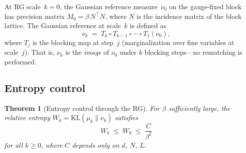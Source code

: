 \documentclass[11pt]{article}
\newtheorem{theorem}{Theorem}[section]
\theoremstyle{definition}
\newcommand{\KL}{\mathrm{KL}}
\begin{document}
At RG scale~$k = 0$, the Gaussian reference
measure~$\nu_0$ on the gauge-fixed block has
precision matrix $M_0 = \beta\,N^\top N$, where
$N$ is the incidence matrix of the block lattice.
The Gaussian reference at scale~$k$ is defined as
\begin{equation}\label{syn-eq:nu_k}
  \nu_k \;=\; T_k \circ T_{k-1} \circ \cdots
  \circ T_1(\nu_0),
\end{equation}
where $T_j$ is the blocking map at step~$j$
(marginalization over fine variables at scale~$j$).
That is, $\nu_k$ is the \emph{image} of $\nu_0$
under $k$ blocking steps---no rematching is performed.

\subsection{Entropy control}

\begin{theorem}[Entropy control through the RG]
\label{syn-thm:entropy}
For $\beta$ sufficiently large, the relative entropy
$W_k = \KL(\mu_k \| \nu_k)$ satisfies
\begin{equation}\label{syn-eq:entropy_decay}
  W_k \;\leq\; W_0 \;\leq\; \frac{C}{\beta^2}
\end{equation}
for all $k \geq 0$, where $C$ depends only on $d$,
$N$, $L$.
\end{theorem}
\end{document}
